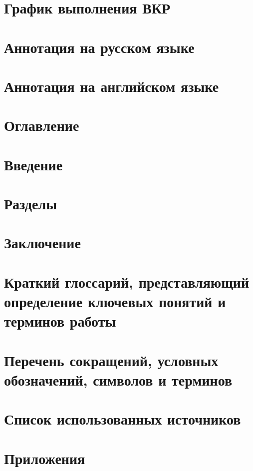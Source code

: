 \documentclass[a4paper,14pt]{extarticle} %
\begin{document}
	
	\section{График выполнения ВКР}
	\section{Аннотация на русском языке}
	\section{Аннотация на английском языке}
	\section{Оглавление}
	\section{Введение}
	\section{Разделы}
	\section{Заключение}
	\section{Краткий глоссарий, представляющий определение ключевых понятий и терминов работы}
	\section{Перечень сокращений, условных обозначений, символов и терминов}
	\section{Список использованных источников}
	\section{Приложения}
\end{document}
